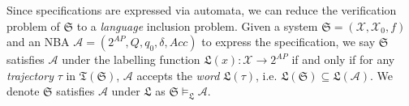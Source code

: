 \documentclass[acmlarge]{acmart}
\begin{document}
Since specifications are expressed via automata, we can reduce the verification problem of $\mathfrak{S}$ to a \emph{language} inclusion problem. Given a system $\mathfrak{S} = (\mathcal{X}, \mathcal{X}_0, f)$ and an NBA $\mathcal{A} = (2^{AP}, Q, q_0, \delta, Acc)$ to express the specification, we say $\mathfrak{S}$ satisfies $\mathcal{A}$ under the labelling function $\mathfrak{L}(x): \mathcal{X} \rightarrow 2^{AP}$  if and only if  for any \emph{trajectory} $\tau$ in $\mathfrak{T}(\mathfrak{S})$, $\mathcal{A}$ accepts the \emph{word} $\mathfrak{L}(\tau)$, i.e. $\mathfrak{L}(\mathfrak{S}) \subseteq \mathfrak{L}(\mathcal{A})$. We denote $\mathfrak{S}$ satisfies $\mathcal{A}$ under $\mathfrak{L}$ as $\mathfrak{S} \models_{\mathfrak{L}} \mathcal{A}$. 

 
 
 
\end{document}
